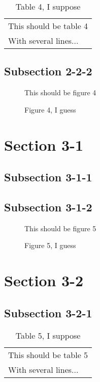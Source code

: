 \documentclass[10pt]{article}
\begin{document}
\begin{table}
  \centering
  \begin{tabular}{l}
    This should be table 4\\
    With several lines...
  \end{tabular}
  \caption{Table 4, I suppose}
  \label{tab:table-4}
\end{table}


\subsection{Subsection 2-2-2}
\label{sec:subsection-2-2-2}

\begin{figure}
  \centering
  This should be figure 4
  \caption{Figure 4, I guess}
  \label{fig:figure-4}
\end{figure}



\section{Section 3-1}
\label{sec:section-3-1}
\secttoc
\sectlot
\sectlof


\subsection{Subsection 3-1-1}
\label{sec:subsection-3-1-1}

\subsection{Subsection 3-1-2}
\label{sec:subsection-3-1-2}

\begin{figure}
  \centering
  This should be figure 5
  \caption{Figure 5, I guess}
  \label{fig:figure-5}
\end{figure}


\section{Section 3-2}
\label{sec:section-3-2}
\secttoc
\sectlot
\sectlof

\subsection{Subsection 3-2-1}
\label{sec:subsection-3-2-1}

\begin{table}
  \centering
  \begin{tabular}{l}
    This should be table 5\\
    With several lines...
  \end{tabular}
  \caption{Table 5, I suppose}
  \label{tab:table-5}
\end{table}
\end{document}
